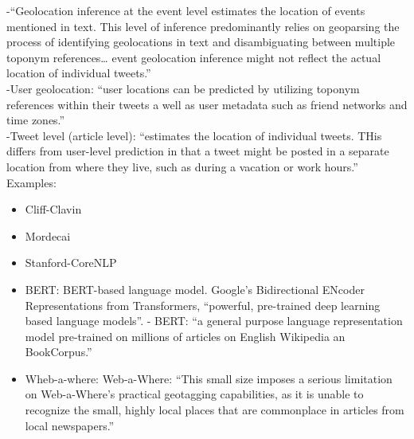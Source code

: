 -{\color{orange}“Geolocation inference at the event level estimates the location of events mentioned in text. This level of inference predominantly relies on geoparsing  the process of identifying geolocations in text and disambiguating between multiple toponym references… event geolocation inference might not reflect the actual location of individual tweets.”\cite{Snyder2019}}\\
-{\color{orange}User geolocation: “user locations can be predicted by utilizing toponym references within their tweets a well as user metadata such as friend networks and time zones.”\cite{Snyder2019}}\\
-{\color{orange}Tweet level (article level): “estimates the location of individual tweets. THis differs from user-level prediction in that a tweet might be posted in a separate location from where they live, such as during a vacation or work hours.”\cite{Snyder2019}}\\

Examples: 
\begin{itemize}
	\item Cliff-Clavin
	\item Mordecai
	\item Stanford-CoreNLP
	\item BERT: {\color{orange}BERT-based language model. Google’s Bidirectional ENcoder Representations from Transformers, “powerful, pre-trained deep learning based language models”\cite{Gupta2020}}. -{\color{orange} BERT: “a general purpose language representation model pre-trained on millions of articles on English Wikipedia an BookCorpus.”\cite{Gupta2020}}
	\item Wheb-a-where: {\color{orange}Web-a-Where: “This small size imposes a serious limitation on Web-a-Where’s practical geotagging capabilities, as it is unable to recognize the small, highly local places that are commonplace in articles from local newspapers.”\cite{Lieberman2010}}
\end{itemize}

